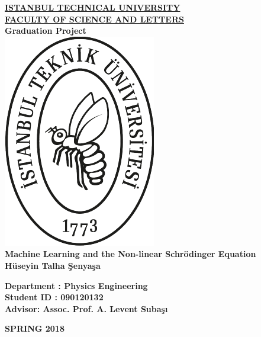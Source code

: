 \documentclass[a4paper,times,hidelinks,12pt]{article}
\begin{document}
\onehalfspacing

\begin{titlepage}
\begin{center}
\vspace*{1cm}
\underline{\textbf{\Large ISTANBUL TECHNICAL UNIVERSITY}} \\[10 pt]

\underline{\textbf{\large FACULTY OF SCIENCE AND LETTERS}} \\[15 pt]

\textbf{\large Graduation Project} \\
\vspace{1.8 cm}
\includegraphics[scale=1.2]{itu_logo.pdf} \\
\vspace{1.8 cm}
\textbf{\large Machine Learning and the Non-linear Schr{\"o}dinger Equation} \\[5 pt]
\textbf{H{\"u}seyin Talha \c{S}enya\c{s}a}\\
\vspace{1.5 cm}
\end{center}
\vfill
\textbf{{Department : Physics Engineering}}\\
    \textbf{Student ID \hspace{0.2 cm}: 090120132}\\
    \textbf{Advisor\hspace{1.1 cm}: Assoc. Prof. A. Levent Suba\c{s}{\i}}
\vspace{2 cm}

\center\textbf{SPRING 2018}

\end{titlepage}
\end{document}
